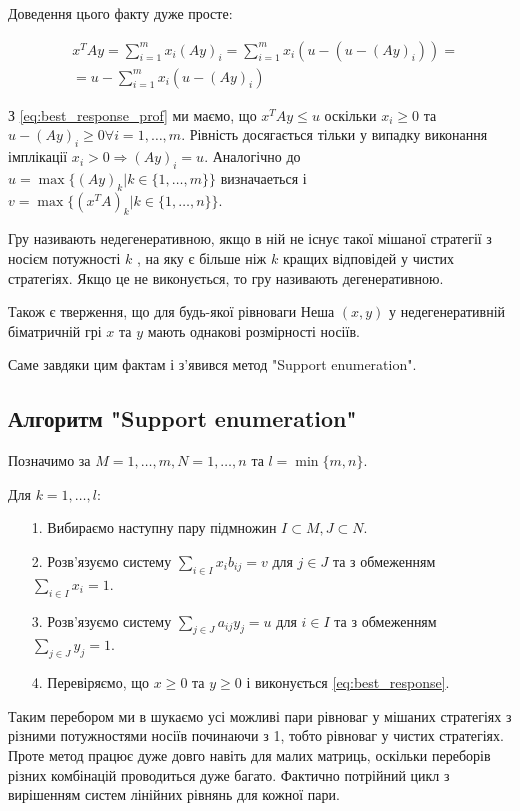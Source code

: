 Доведення цього факту дуже просте:

\begin{equation}
	\begin{aligned}
		&x^TAy = \sum_{i=1}^{m}x_i(Ay)_i = \sum_{i=1}^{m}x_i(u - (u - (Ay)_i)) =\\
		&= u - \sum_{i=1}^{m}x_i(u - (Ay)_i)
	\end{aligned}
	\label{eq:best_response_prof}
\end{equation}

З \ref{eq:best_response_prof} ми маємо, що $x^TAy \le u$ оскільки $x_i \ge 0$ та $u-(Ay)_i \ge 0 \forall i = {1,\ldots,m}$. Рівність досягається тільки у випадку виконання імплікації $x_i > 0 \Rightarrow (Ay)_i = u$. Аналогічно до $u = \max\{(Ay)_k | k \in \{1,\ldots,m\} \}$ визначаеться і $v = \max\{(x^TA)_k | k \in \{1,\ldots,n\} \}$.

Гру називають недегенеративною, якщо в ній не існує такої мішаної стратегії з носієм потужності $k$ , на яку є більше ніж $k$ кращих відповідей у чистих стратегіях. Якщо це не виконується, то гру називають дегенеративною.

Також є тверження, що для будь-якої рівноваги Неша $(x,y)$ у недегенеративній біматричній грі $x$ та $y$ мають однакові розмірності носіїв.

Саме завдяки цим фактам і з'явився метод "Support enumeration".

\subsection{Алгоритм "Support enumeration"}

Позначимо за $M={1,\ldots,m}, N={1,\ldots,n}$ та $l=\min\{m,n\}$.

Для $k=1,\ldots,l$:
\begin{itemize}
	\item[1.] Вибираємо наступну пару підмножин $I \subset M, J \subset N$.
	\item[2.] Розв'язуємо систему $\sum_{i \in I}x_ib_{ij}=v$ для $j \in J$ та з обмеженням $\sum_{i \in I}x_i = 1$.
	\item[3.] Розв'язуємо систему $\sum_{j \in J}a_{ij}y_j=u$ для $i \in I$ та з обмеженням $\sum_{j \in J}y_j = 1$.
	\item[4.] Перевіряємо, що $x \ge 0$ та $y \ge 0$ і виконується \ref{eq:best_response}.
\end{itemize}

Таким перебором ми в шукаємо усі можливі пари рівноваг у мішаних стратегіях з різними потужностями носіїв починаючи з 1, тобто рівноваг у чистих стратегіях. Проте метод працює дуже довго навіть для малих матриць, оскільки переборів різних комбінацій проводиться дуже багато. Фактично потрійний цикл з вирішенням систем лінійних рівнянь для кожної пари.


